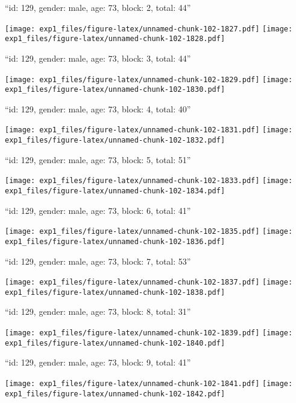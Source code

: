\documentclass[11pt,,]{article}
\begin{document}
\newpage
[1] 

``id: 129, gender: male, age: 73, block: 2, total: 44''

\texttt{[image: exp1\_files/figure-latex/unnamed-chunk-102-1827.pdf]}
\texttt{[image: exp1\_files/figure-latex/unnamed-chunk-102-1828.pdf]}

\newpage
[1] 

``id: 129, gender: male, age: 73, block: 3, total: 44''

\texttt{[image: exp1\_files/figure-latex/unnamed-chunk-102-1829.pdf]}
\texttt{[image: exp1\_files/figure-latex/unnamed-chunk-102-1830.pdf]}

\newpage
[1] 

``id: 129, gender: male, age: 73, block: 4, total: 40''

\texttt{[image: exp1\_files/figure-latex/unnamed-chunk-102-1831.pdf]}
\texttt{[image: exp1\_files/figure-latex/unnamed-chunk-102-1832.pdf]}

\newpage
[1] 

``id: 129, gender: male, age: 73, block: 5, total: 51''

\texttt{[image: exp1\_files/figure-latex/unnamed-chunk-102-1833.pdf]}
\texttt{[image: exp1\_files/figure-latex/unnamed-chunk-102-1834.pdf]}

\newpage
[1] 

``id: 129, gender: male, age: 73, block: 6, total: 41''

\texttt{[image: exp1\_files/figure-latex/unnamed-chunk-102-1835.pdf]}
\texttt{[image: exp1\_files/figure-latex/unnamed-chunk-102-1836.pdf]}

\newpage
[1] 

``id: 129, gender: male, age: 73, block: 7, total: 53''

\texttt{[image: exp1\_files/figure-latex/unnamed-chunk-102-1837.pdf]}
\texttt{[image: exp1\_files/figure-latex/unnamed-chunk-102-1838.pdf]}

\newpage
[1] 

``id: 129, gender: male, age: 73, block: 8, total: 31''

\texttt{[image: exp1\_files/figure-latex/unnamed-chunk-102-1839.pdf]}
\texttt{[image: exp1\_files/figure-latex/unnamed-chunk-102-1840.pdf]}

\newpage
[1] 

``id: 129, gender: male, age: 73, block: 9, total: 41''

\texttt{[image: exp1\_files/figure-latex/unnamed-chunk-102-1841.pdf]}
\texttt{[image: exp1\_files/figure-latex/unnamed-chunk-102-1842.pdf]}
\end{document}
